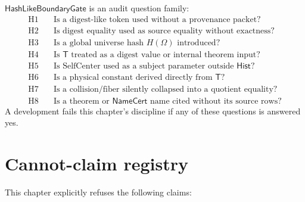 \begin{definition}[HashLikeBoundaryGate]
\label{def:hash-like-boundary-gate}
$\mathsf{HashLikeBoundaryGate}$ is an audit question family:
$$
\begin{aligned}
\mathrm{H1} &\quad \text{Is a digest-like token used without a provenance packet?} \\
\mathrm{H2} &\quad \text{Is digest equality used as source equality without exactness?} \\
\mathrm{H3} &\quad \text{Is a global universe hash } H(\Omega) \text{ introduced?} \\
\mathrm{H4} &\quad \text{Is } \mathsf{T} \text{ treated as a digest value or internal theorem input?} \\
\mathrm{H5} &\quad \text{Is } \mathrm{SelfCenter} \text{ used as a subject parameter outside } \mathsf{Hist}? \\
\mathrm{H6} &\quad \text{Is a physical constant derived directly from } \mathsf{T}? \\
\mathrm{H7} &\quad \text{Is a collision/fiber silently collapsed into a quotient equality?} \\
\mathrm{H8} &\quad \text{Is a theorem or } \mathsf{NameCert} \text{ name cited without its source rows?}
\end{aligned}
$$
A development fails this chapter's discipline if any of these questions is answered yes.
\end{definition}

\section{Cannot-claim registry}
\label{sec:hash-like-cannot-claim}

This chapter explicitly refuses the following claims:

